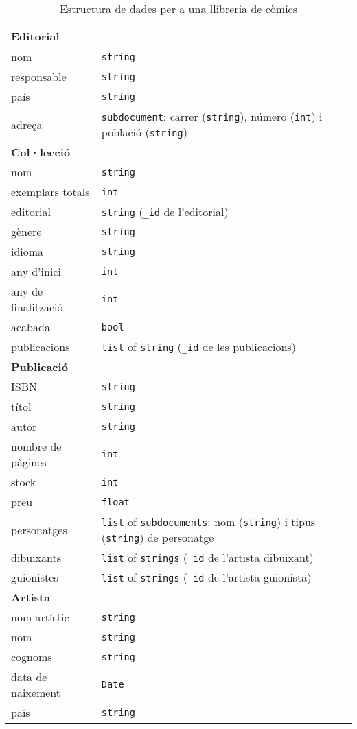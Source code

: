 \documentclass{article}
\begin{document}
\begin{table}[htbp]
\centering
\caption{Estructura de dades per a una llibreria de còmics}
\label{tab:estructura_dades}
\begin{tabularx}{\textwidth}{lX}
\toprule
\textbf{Editorial} & \\
\midrule
nom & \texttt{string} \\
responsable & \texttt{string} \\
pa\'is & \texttt{string} \\
adreça & \texttt{subdocument}: carrer (\texttt{string}), n\'umero (\texttt{int}) i poblaci\'o (\texttt{string})\\
\midrule
\textbf{Col·lecció} & \\
\midrule
nom & \texttt{string} \\
exemplars totals & \texttt{int} \\
editorial & \texttt{string} (\texttt{\_id} de l'editorial) \\
gènere & \texttt{string} \\
idioma & \texttt{string} \\
any d'inici & \texttt{int} \\
any de finalització & \texttt{int} \\
acabada & \texttt{bool} \\
publicacions & \texttt{list} of \texttt{string} (\texttt{_id} de les publicacions) \\
\midrule
\textbf{Publicació} & \\
\midrule
ISBN & \texttt{string} \\
títol & \texttt{string} \\
autor & \texttt{string} \\
nombre de pàgines & \texttt{int} \\
stock & \texttt{int} \\
preu & \texttt{float} \\
personatges & \texttt{list} of \texttt{subdocuments}: nom (\texttt{string}) i tipus (\texttt{string}) de personatge \\
dibuixants & \texttt{list} of \texttt{strings} (\texttt{\_id} de l'artista dibuixant)\\
guionistes & \texttt{list} of \texttt{strings} (\texttt{\_id} de l'artista guionista)\\
\midrule
\textbf{Artista} & \\
\midrule
nom artístic & \texttt{string} \\
nom & \texttt{string} \\
cognoms & \texttt{string} \\
data de naixement & \texttt{Date} \\
país & \texttt{string} \\
\bottomrule
\end{tabularx}
\end{table}
\end{document}
